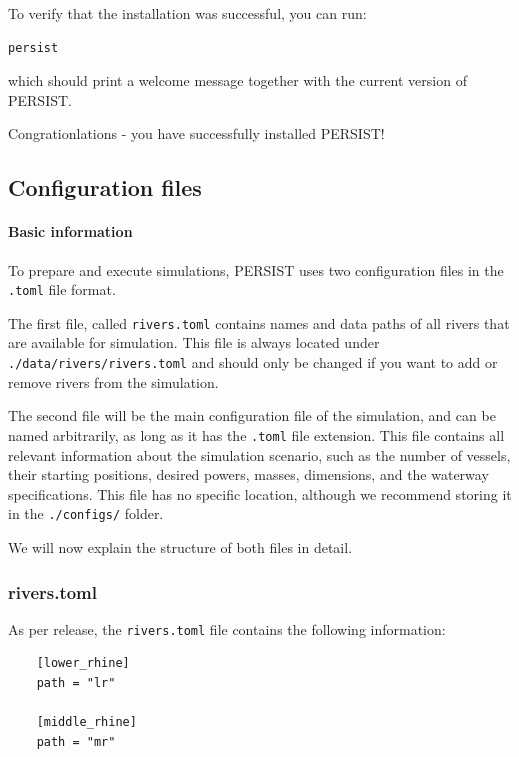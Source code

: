 \documentclass[
	a4paper, %
	12pt, %
]{persist}
\begin{document}
To verify that the installation was successful, you can run:

\begin{lstlisting}[language=bash]
	persist 
\end{lstlisting}

which should print a welcome message together with the current version of PERSIST.

Congrationlations - you have successfully installed PERSIST!

\subsection{Configuration files}

\paragraph{Basic information}

To prepare and execute simulations, PERSIST uses two configuration files in the \verb|.toml| file format. 

The first file, called \verb|rivers.toml| contains names and data paths of all rivers that are available for simulation. This file is always located under \verb|./data/rivers/rivers.toml| and should only be changed if you want to add or remove rivers from the simulation.

The second file will be the main configuration file of the simulation, and can be named arbitrarily, as long as it has the \verb|.toml| file extension. This file contains all relevant information about the simulation scenario, such as the number of vessels, their starting positions, desired powers, masses, dimensions, and the waterway specifications. This file has no specific location, although we recommend storing it in the \verb|./configs/| folder.

We will now explain the structure of both files in detail.

\subsubsection{rivers.toml}

As per release, the \verb|rivers.toml| file contains the following information:
\begin{lstlisting}
	[lower_rhine]
	path = "lr"

	[middle_rhine]
	path = "mr"
\end{lstlisting}
\end{document}
